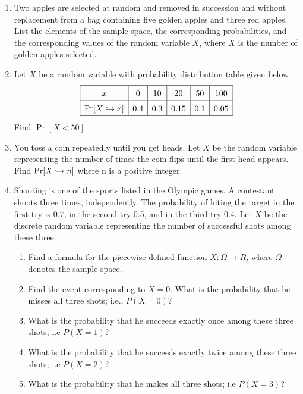 \documentclass[../main.tex]{subfiles}
\begin{document}
\begin{exercises}
	\begin{enumerate}
		\item %
		Two apples are selected at random and removed in succession and without
		replacement from a bag containing five golden apples and three red apples.
		List the elements of the sample space, the corresponding probabilities, and
		the corresponding values of the random variable $X$, where $X$ is the number
		of golden apples selected.
		
		\item %
		Let $X$ be a random variable with probability distribution table given below
			\[\def\arraystretch{1.5}
			\begin{array}{|c|c|c|c|c|c|}
				\hline
				x & 0 & 10 & 20 & 50 & 100 \\
				\hline
				\Pr[X \dsp x] & 0.4 & 0.3 & 0.15 & 0.1 & 0.05 \\
				\hline
			\end{array}\]
		Find $\Pr[X<50]$
		
		\item %
		You toss a coin repeatedly until you get heads. Let $X$ be the random variable
		representing the number of times the coin flips until the first head appears.
		Find $\mathrm{Pr}[X \hookrightarrow n]$ where n is a positive integer.
		
		\item %
		Shooting is one of the sports listed in the Olympic games. A contestant
		shoots three times, independently. The probability of hiting the target in
		the first try is 0.7, in the second try 0.5, and in the third try 0.4. Let $X$
		be the discrete random variable representing the number of successful shots
		among these three.
		\begin{enumerate}
			\item Find a formula for the piecewise defined function $X : Ω → R$, where $Ω$
			denotes the sample space.
			\item Find the event corresponding to $X = 0$. What is the probability that he
			misses all three shots; i.e., $P (X = 0)$?
			\item What is the probability that he succeeds exactly once among these three
			shots; i.e $P (X = 1)$?
			\item What is the probability that he succeeds exactly twice among these three
			shots; i.e $P (X = 2)$?
			\item What is the probability that he makes all three shots; i.e $P (X = 3)$?
		\end{enumerate}
	

\end{enumerate}
\end{exercises}
\end{document}
